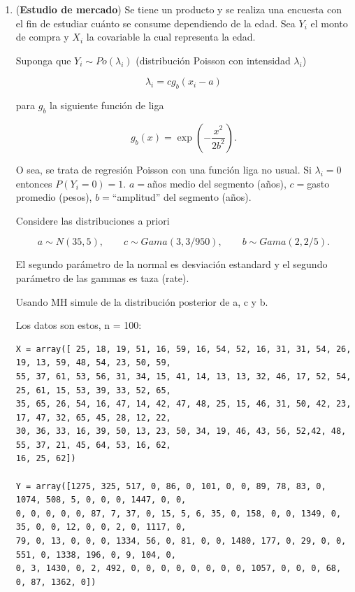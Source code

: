 \documentclass{article}
\begin{document}
\begin{enumerate}
\begin{proof}[Solución]
    \end{proof}


    \item (\textbf{Estudio de mercado}) Se tiene un producto y se realiza una encuesta con el fin de estudiar cuánto se consume dependiendo de la edad. Sea $Y_i$ el monto de compra y $X_i$ la covariable la cual representa la edad.
    
    Suponga que $Y_i \sim Po(\lambda_i)$ (distribución Poisson con intensidad $\lambda_i$)
    
    \[\lambda_i = cg_b(x_i - a)\]

    para $g_b$ la siguiente función de liga 
    
    \[ g_b(x) = \exp\left(- \frac{x^2}{2b^2}\right) .\]

    O sea, se trata de regresión Poisson con una función liga no usual. Si $\lambda_i = 0$ entonces $P(Y_i = 0) = 1$. $a = $años medio del segmento (años), $c = $gasto promedio (pesos), $b = $``amplitud'' del segmento (años).

    Considere las distribuciones a priori
    
    \[a \sim N (35, 5), \qquad c \sim Gama(3, 3/950), \qquad b \sim Gama(2, 2/5).\]
    
    El segundo parámetro de la normal es desviación estandard y el segundo parámetro de las gammas es taza (rate).
    
    Usando MH simule de la distribución posterior de a, c y b.
    
    Los datos son estos, n = 100:

\begin{verbatim}
X = array([ 25, 18, 19, 51, 16, 59, 16, 54, 52, 16, 31, 31, 54, 26, 19, 13, 59, 48, 54, 23, 50, 59, 
55, 37, 61, 53, 56, 31, 34, 15, 41, 14, 13, 13, 32, 46, 17, 52, 54, 25, 61, 15, 53, 39, 33, 52, 65, 
35, 65, 26, 54, 16, 47, 14, 42, 47, 48, 25, 15, 46, 31, 50, 42, 23, 17, 47, 32, 65, 45, 28, 12, 22, 
30, 36, 33, 16, 39, 50, 13, 23, 50, 34, 19, 46, 43, 56, 52,42, 48, 55, 37, 21, 45, 64, 53, 16, 62, 
16, 25, 62])

Y = array([1275, 325, 517, 0, 86, 0, 101, 0, 0, 89, 78, 83, 0, 1074, 508, 5, 0, 0, 0, 1447, 0, 0, 
0, 0, 0, 0, 0, 87, 7, 37, 0, 15, 5, 6, 35, 0, 158, 0, 0, 1349, 0, 35, 0, 0, 12, 0, 0, 2, 0, 1117, 0, 
79, 0, 13, 0, 0, 0, 1334, 56, 0, 81, 0, 0, 1480, 177, 0, 29, 0, 0, 551, 0, 1338, 196, 0, 9, 104, 0, 
0, 3, 1430, 0, 2, 492, 0, 0, 0, 0, 0, 0, 0, 0, 1057, 0, 0, 0, 68, 0, 87, 1362, 0]) \end{verbatim}



\end{enumerate}
\end{document}
